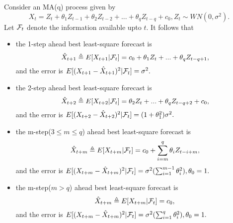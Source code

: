 \begin{lemma}\cite[62]{tsay2005analysis}
	Consider an MA(q) process given by $$X_t = Z_t + \theta_1 Z_{t-1} + \theta_2 Z_{t-2} + ... + \theta_q Z_{t-q} + c_0, Z_t\sim WN(0,\sigma^2).$$ 
	Let $\mathcal{F}_t$ denote the information available upto $t$. It follows that
	\begin{itemize}
		\item the 1-step ahead best least-square forecast is
		$$\hat{X}_{t+1} \triangleq E[X_{t+1}|\mathcal{F}_t] = c_0 + \theta_1Z_t + ... + \theta_q Z_{t-q+1},$$
		and the error is $E[(X_{t+1} - \hat{X}_{t+1})^2|\mathcal{F}_t] = \sigma^2.$	
		\item the 2-step ahead best least-square forecast is
		$$\hat{X}_{t+2} \triangleq E[X_{t+2}|\mathcal{F}_t] = \theta_2 Z_{t} + ... + \theta_q Z_{t-q+2} + c_0,$$
		and the error is $E[(X_{t+2} - \hat{X}_{t+2})^2|\mathcal{F}_t] = (1 + \theta_1^2)\sigma^2.$	
		\item the m-step($3\leq m \leq q$) ahead best least-square forecast is
		$$\hat{X}_{t+m} \triangleq E[X_{t+m}|\mathcal{F}_t] = c_0 + \sum_{i=m}^q \theta_i Z_{t-i+m},$$
		and the error is $E[(X_{t+m} - \hat{X}_{t+m})^2|\mathcal{F}_t] = \sigma^2(\sum_{i=1}^{m-1} \theta_i^2),\theta_0 = 1.$
		
		\item the m-step($m > q$) ahead best least-square forecast is
		$$\hat{X}_{t+m}\triangleq E[X_{t+m}|\mathcal{F}_t] = c_0,$$
		and the error is  $E[(X_{t+m} - \hat{X}_{t+m})^2|\mathcal{F}_t] = \sigma^2(\sum_{i=1}^{q} \theta_i^2),\theta_0 = 1.$
	\end{itemize}
\end{lemma}
